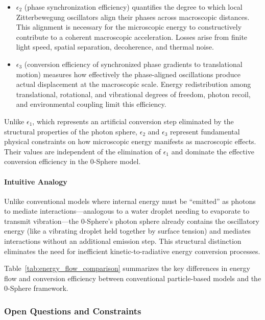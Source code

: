\documentclass[%
 reprint,
 amsmath,amssymb,
 aps,
 prb,
]{revtex4-2}
\numberwithin{equation}{section}
\begin{document}
\begin{itemize}
\item $\epsilon_2$ (phase synchronization efficiency) quantifies the degree to which local Zitterbewegung oscillators align their phases across macroscopic distances. This alignment is necessary for the microscopic energy to constructively contribute to a coherent macroscopic acceleration. Losses arise from finite light speed, spatial separation, decoherence, and thermal noise.

\item $\epsilon_3$ (conversion efficiency of synchronized phase gradients to translational motion) measures how effectively the phase-aligned oscillations produce actual displacement at the macroscopic scale. Energy redistribution among translational, rotational, and vibrational degrees of freedom, photon recoil, and environmental coupling limit this efficiency.
\end{itemize}

Unlike $\epsilon_1$, which represents an artificial conversion step eliminated by the structural properties of the photon sphere, $\epsilon_2$ and $\epsilon_3$ represent fundamental physical constraints on how microscopic energy manifests as macroscopic effects. Their values are independent of the elimination of $\epsilon_1$ and dominate the effective conversion efficiency in the 0-Sphere model.

\vspace{0.5cm}

\paragraph{Intuitive Analogy}

Unlike conventional models where internal energy must be ``emitted'' as photons to mediate interactions—analogous to a water droplet needing to evaporate to transmit vibration—the 0-Sphere's photon sphere already contains the oscillatory energy (like a vibrating droplet held together by surface tension) and mediates interactions without an additional emission step. This structural distinction eliminates the need for inefficient kinetic-to-radiative energy conversion processes.

Table~\ref{tab:energy_flow_comparison} summarizes the key differences in energy flow and conversion efficiency between conventional particle-based models and the 0-Sphere framework.

\subsubsection{Open Questions and Constraints}
\end{document}
